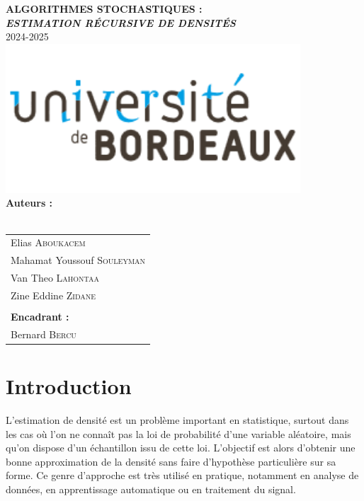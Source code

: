 \documentclass[12pt]{article}
\begin{document}
\begin{center}
  \Huge{\textbf{ALGORITHMES STOCHASTIQUES :}}\\
  \vspace{5mm}
  \Huge{\textbf{\textit{ESTIMATION RÉCURSIVE DE DENSITÉS}}}\\
  \vspace{5mm}
  \Huge{2024-2025}\\
  \vspace{2cm}
  \includegraphics[width=11cm]{logo-UB.png}\\
  \vspace{1cm}
  \textbf{Auteurs :} \\
  \\[0.5cm]
  \begin{tabular}{l@{}}
    Elias \textsc{Aboukacem} \\
    Mahamat Youssouf \textsc{Souleyman} \\
    Van Theo \textsc{Lahontaa} \\
    Zine Eddine \textsc{Zidane} \\
    \\[0.5cm]
    \textbf{Encadrant :} \\
    Bernard \textsc{Bercu} \\ %
\end{tabular}
\end{center}

\clearpage
\tableofcontents
\clearpage

\section*{Introduction}

L’estimation de densité est un problème important en statistique, surtout dans les cas où l’on ne connaît pas la loi de probabilité d’une variable aléatoire, mais qu’on dispose d’un échantillon issu de cette loi. L’objectif est alors d’obtenir une bonne approximation de la densité sans faire d’hypothèse particulière sur sa forme. Ce genre d’approche est très utilisé en pratique, notamment en analyse de données, en apprentissage automatique ou en traitement du signal.
\end{document}
